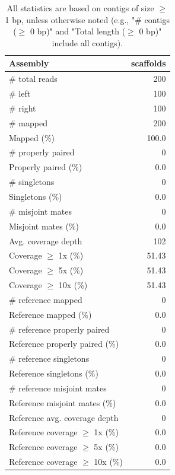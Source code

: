 \documentclass[12pt,a4paper]{article}
\begin{document}
\begin{table}[ht]
\begin{center}
\caption{All statistics are based on contigs of size $\geq$ 1 bp, unless otherwise noted (e.g., "\# contigs ($\geq$ 0 bp)" and "Total length ($\geq$ 0 bp)" include all contigs).}
\begin{tabular}{|l*{1}{|r}|}
\hline
Assembly & scaffolds \\ \hline
\# total reads & 200 \\ \hline
\# left & 100 \\ \hline
\# right & 100 \\ \hline
\# mapped & 200 \\ \hline
Mapped (\%) & 100.0 \\ \hline
\# properly paired & 0 \\ \hline
Properly paired (\%) & 0.0 \\ \hline
\# singletons & 0 \\ \hline
Singletons (\%) & 0.0 \\ \hline
\# misjoint mates & 0 \\ \hline
Misjoint mates (\%) & 0.0 \\ \hline
Avg. coverage depth & 102 \\ \hline
Coverage $\geq$ 1x (\%) & 51.43 \\ \hline
Coverage $\geq$ 5x (\%) & 51.43 \\ \hline
Coverage $\geq$ 10x (\%) & 51.43 \\ \hline
\# reference mapped & 0 \\ \hline
Reference mapped (\%) & 0.0 \\ \hline
\# reference properly paired & 0 \\ \hline
Reference properly paired (\%) & 0.0 \\ \hline
\# reference singletons & 0 \\ \hline
Reference singletons (\%) & 0.0 \\ \hline
\# reference misjoint mates & 0 \\ \hline
Reference misjoint mates (\%) & 0.0 \\ \hline
Reference avg. coverage depth & 0 \\ \hline
Reference coverage $\geq$ 1x (\%) & 0.0 \\ \hline
Reference coverage $\geq$ 5x (\%) & 0.0 \\ \hline
Reference coverage $\geq$ 10x (\%) & 0.0 \\ \hline
\end{tabular}
\end{center}
\end{table}
\end{document}

